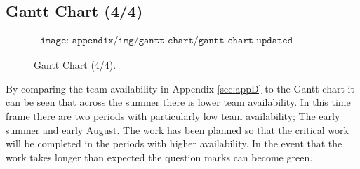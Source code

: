 \begin{landscape}
\subsection{Gantt Chart (4/4)}

\begin{figure}[H]
    \begin{align*}
        \texttt{[image: appendix/img/gantt-chart/gantt-chart-updated-part4.png]}
    \end{align*}
    \caption{Gantt Chart (4/4).}
    \label{fig:gantt-chart-4}
\end{figure}

By comparing the team availability in Appendix \ref{sec:appD} to the Gantt chart it can be seen that across the summer there is lower team availability. In this time frame there are two periods with particularly low team availability; The early summer and early August. The work has been planned so that the critical work will be completed in the periods with higher availability. In the event that the work takes longer than expected the question marks can become green.
\end{landscape}